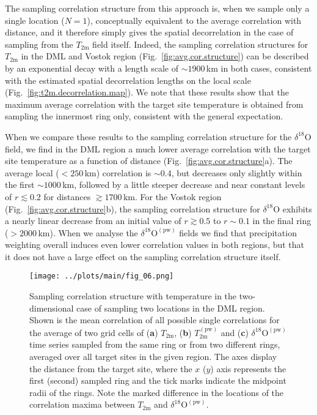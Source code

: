 \documentclass[draft]{agujournal2019}
\begin{document}
The sampling correlation structure from this approach is, when we sample only a
single location ($N=1$), conceptually equivalent to the average correlation with
distance, and it therefore simply gives the spatial decorrelation in the case of
sampling from the $T_{\mathrm{2m}}$ field itself. Indeed, the sampling
correlation structures for $T_{\mathrm{2m}}$ in the DML and Vostok region
(Fig.~\ref{fig:avg.cor.structure}) can be described by an exponential decay with
a length scale of $\sim1900$\,km in both cases, consistent with the estimated
spatial decorrelation lengths on the local scale
(Fig.~\ref{fig:t2m.decorrelation.map}). We note that these results show that the
maximum average correlation with the target site temperature is obtained from
sampling the innermost ring only, consistent with the general expectation.

When we compare these results to the sampling correlation structure for the
$\delta^{18}\mathrm{O}$ field, we find in the DML region a much lower average
correlation with the target site temperature as a function of distance
(Fig.~\ref{fig:avg.cor.structure}a). The average local ($<250$\,km) correlation
is $\sim0.4$, but decreases only slightly within the first $\sim1000$\,km,
followed by a little steeper decrease and near constant levels of $r\lesssim0.2$
for distances $\gtrsim1700$\,km. For the Vostok region
(Fig.~\ref{fig:avg.cor.structure}b), the sampling correlation structure for
$\delta^{18}\mathrm{O}$ exhibits a nearly linear decrease from an initial value
of $r\gtrsim0.5$ to $r\sim0.1$ in the final ring ($>2000$\,km). When we analyse
the $\delta^{18}\mathrm{O}^{\mathrm{(pw)}}$ fields we find that precipitation
weighting overall induces even lower correlation values in both regions, but
that it does not have a large effect on the sampling correlation structure
itself.

\begin{figure*}[t]%
\centering
\texttt{[image: ../plots/main/fig\_06.png]}
\caption{%
  Sampling correlation structure with temperature in the two-dimensional case
  of sampling two locations in the DML region. Shown is the mean correlation of
  all possible single correlations for the average of two grid cells of
  (\textbf{a}) $T_{\mathrm{2m}}$, (\textbf{b}) $T_{\mathrm{2m}}^{\mathrm{(pw)}}$
  and (\textbf{c}) $\delta^{18}\mathrm{O}^{\mathrm{(pw)}}$ time series sampled
  from the same ring or from two different rings, averaged over all target sites
  in the given region. The axes display the distance from the target site, where
  the $x$ ($y$) axis represents the first (second) sampled ring and the tick
  marks indicate the midpoint radii of the rings. Note the marked difference
  in the locations of the correlation maxima between $T_{\mathrm{2m}}$ and
  $\delta^{18}\mathrm{O}^{\mathrm{(pw)}}$.}
\label{fig:two-core-correlation}%
\end{figure*}%
\end{document}

